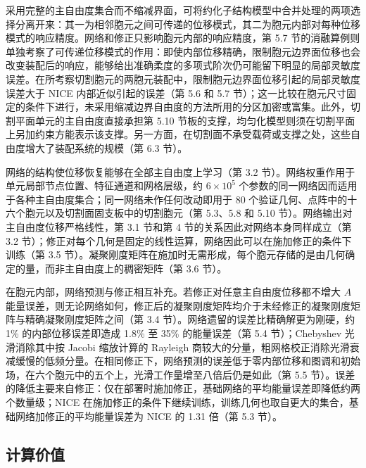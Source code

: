\documentclass[preprint,12pt,authoryear]{elsarticle}
\begin{document}
采用完整的主自由度集合而不缩减界面，可将约化子结构模型中合并处理的两项选择分离开来：其一为相邻胞元之间可传递的位移模式，其二为胞元内部对每种位移模式的响应精度。网络和修正只影响胞元内部的响应精度，第 5.7 节的消融算例则单独考察了可传递位移模式的作用：即使内部位移精确，限制胞元边界面位移也会改变装配后的响应，能够给出准确柔度的多项式阶次仍可能留下明显的局部灵敏度误差。在所考察切割胞元的两胞元装配中，限制胞元边界面位移引起的局部灵敏度误差大于 NICE 内部近似引起的误差（第 5.6 和 5.7 节）；这一比较在胞元尺寸固定的条件下进行，未采用缩减边界自由度的方法所用的分区加密或富集。此外，切割平面单元的主自由度直接承担第 5.10 节板的支撑，均匀化模型则须在切割平面上另加约束方能表示该支撑。另一方面，在切割面不承受载荷或支撑之处，这些自由度增大了装配系统的规模（第 6.3 节）。

网络的结构使位移恢复能够在全部主自由度上学习（第 3.2 节）。网络权重作用于单元局部节点位置、特征通道和网格层级，约 \(6\times10^5\) 个参数的同一网络因而适用于各种主自由度集合；同一网络未作任何改动即用于 80 个验证几何、点阵中的十六个胞元以及切割面固支板中的切割胞元（第 5.3、5.8 和 5.10 节）。网络输出对主自由度位移严格线性，第 3.1 节和第 4 节的关系因此对网络本身同样成立（第 3.2 节）；修正对每个几何是固定的线性运算，网络因此可以在施加修正的条件下训练（第 3.5 节）。凝聚刚度矩阵在施加时无需形成，每个胞元存储的是由几何确定的量，而非主自由度上的稠密矩阵（第 3.6 节）。

在胞元内部，网络预测与修正相互补充。若修正对任意主自由度位移都不增大 \(A\) 能量误差，则无论网络如何，修正后的凝聚刚度矩阵均介于未经修正的凝聚刚度矩阵与精确凝聚刚度矩阵之间（第 3.4 节）。网络遗留的误差比精确解更为刚硬，约 1\% 的内部位移误差即造成 1.8\% 至 35\% 的能量误差（第 5.4 节）；Chebyshev 光滑消除其中按 Jacobi 缩放计算的 Rayleigh 商较大的分量，粗网格校正消除光滑衰减缓慢的低频分量。在相同修正下，网络预测的误差低于零内部位移和图调和初始场，在六个胞元中的五个上，光滑工作量增至八倍后仍是如此（第 5.5 节）。误差的降低主要来自修正：仅在部署时施加修正，基础网络的平均能量误差即降低约两个数量级；NICE 在施加修正的条件下继续训练，训练几何也取自更大的集合，基础网络加修正的平均能量误差为 NICE 的 1.31 倍（第 5.3 节）。

\subsection{计算价值}
\end{document}
